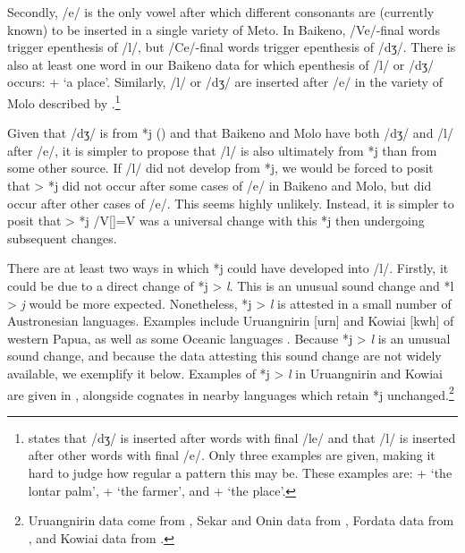 \documentclass[output=paper]{langscibook}
\begin{document}
Secondly, /e/ is the only vowel after which different
consonants are (currently known) to be inserted in a single variety of Meto.
In Baikeno, /Ve/-final words trigger epenthesis of /l/,
but /Ce/-final words trigger epenthesis of /dʒ/.
There is also at least one word in our Baikeno data
for which epenthesis of /l/ or \mbox{/dʒ/} occurs:
 +  {\ra}  {\tl}  `a place'.
Similarly, /l/ or /dʒ/ are inserted after /e/
in the variety of Molo described by \citet{mo21}.\footnote{%
		\citet{mo21} states that /dʒ/ is inserted after words with final /le/
		and that /l/ is inserted after other words with final /e/.
		Only three examples are given, making it hard to judge
		how regular a pattern this may be.
		These examples are:  +  {\ra}  `the lontar palm',
		 +  {\ra}  `the farmer',
		and  +   `the place'.
		}

Given that /dʒ/ is from *j () and that
Baikeno and Molo have both /dʒ/ and /l/ after /e/,
it is simpler to propose that /l/ is also ultimately
from *j than from some other source.
If /l/ did not develop from *j, we would be forced
to posit that {\0} > *j did not occur after some
cases of /e/ in Baikeno and Molo, but did occur after other cases of /e/.
This seems highly unlikely. Instead, it is simpler to posit 
that {\0} > *j /V[]{\gap}=V was a universal change
with this *j then undergoing subsequent changes.

There are at least two ways in which *j could have developed into /l/.
Firstly, it could be due to a direct change of *j > \textit{l}.
This is an unusual sound change and
*l > \textit{j} would be more expected.
Nonetheless, *j > \textit{l} is attested in a small number of Austronesian languages.
Examples include Uruangnirin [urn] and Kowiai [kwh] of western Papua,
as well as some Oceanic languages \citep[200, 204]{ro88}.
Because *j > \textit{l} is an unusual sound change,
and because the data attesting this sound change
are not widely available, we exemplify it below.
Examples of *j > \textit{l} in Uruangnirin and Kowiai are given in ,
alongside cognates in nearby languages which retain *j unchanged.\footnote{%
		Uruangnirin data come from \citet{vi19}, Sekar and Onin data from \citet{do10},
		Fordata data from \citet{dr32-Fordata}, and Kowiai data from  \citet{wawa91}.}
\end{document}
